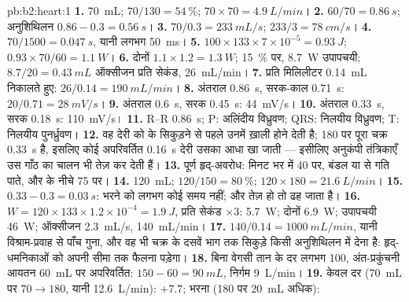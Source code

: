 \begin{solution}{pb:b2:heart:1}
\textbf{1.} \qty{70}{mL}; $70/130 = \qty{54}{\%}$; $70\times 70 =
\qty{4.9}{L/min}$।
\textbf{2.} $60/70 = \qty{0.86}{s}$; अनुशिथिलन $0.86 - 0.3 =
\qty{0.56}{s}$।
\textbf{3.} $70/0.3 = \qty{233}{mL/s}$; $233/3 = \qty{78}{cm/s}$।
\textbf{4.} $70/1500 = \qty{0.047}{s}$, यानी लगभग \qty{50}{ms}।
\textbf{5.} $100\times 133\times 7\times 10^{-5} = \qty{0.93}{J}$;
$0.93\times 70/60 = \qty{1.1}{W}$।
\textbf{6.} दोनों  $1.1\times 1.2 = \qty{1.3}{W}$;
\qty{15}{\%} पर, \qty{8.7}{W} उपापचयी; $8.7/20 = \qty{0.43}{mL}$
ऑक्सीजन प्रति सेकंड, \qty{26}{mL/min}।
\textbf{7.} प्रति मिलिलीटर  \qty{0.14}{mL} निकालते हुए:
$26/0.14 = \qty{190}{mL/min}$।
\textbf{8.} अंतराल \qty{0.86}{s}, सरक-काल \qty{0.71}{s}:
$20/0.71 = \qty{28}{mV/s}$।
\textbf{9.} अंतराल \qty{0.6}{s}, सरक \qty{0.45}{s}: \qty{44}{mV/s}।
\textbf{10.} अंतराल \qty{0.33}{s}, सरक \qty{0.18}{s}: \qty{110}{mV/s}।
\textbf{11.} R--R \qty{0.86}{s}; P: अलिंदीय विध्रुवण; QRS:
निलयीय विध्रुवण; T: निलयीय पुनर्ध्रुवण।
\textbf{12.} वह देरी  को  के सिकुड़ने से पहले
उनमें ख़ाली होने देती है; 180 पर पूरा चक्र \qty{0.33}{s} है, इसलिए कोई
अपरिवर्तित \qty{0.16}{s} देरी उसका आधा खा जाती --- इसीलिए
अनुकंपी तंत्रिकाएँ उस गाँठ का चालन भी तेज़ कर देती हैं।
\textbf{13.} पूर्ण हृद्-अवरोध:  मिनट भर में 40 पर,
बंडल या  से गति पाते, और 
 के नीचे 75 पर।
\textbf{14.} \qty{120}{mL}; $120/150 = \qty{80}{\%}$; $120\times 180 =
\qty{21.6}{L/min}$।
\textbf{15.} $0.33 - 0.3 = \qty{0.03}{s}$: भरने को लगभग कोई समय नहीं;
और तेज़ हो तो  ढह जाता है।
\textbf{16.} $W = 120\times 133\times 1.2\times 10^{-4} = \qty{1.9}{J}$,
प्रति सेकंड $\times 3$: \qty{5.7}{W}; दोनों  \qty{6.9}{W};
उपापचयी \qty{46}{W}; ऑक्सीजन \qty{2.3}{mL/s}, \qty{140}{mL/min}।
\textbf{17.} $140/0.14 = \qty{1000}{mL/min}$, यानी विश्राम-प्रवाह से
पाँच गुना, और वह भी चक्र के दसवें भाग तक सिकुड़े किसी अनुशिथिलन में देना है:
हृद्-धमनिकाओं को अपनी सीमा तक फैलना पड़ेगा।
\textbf{18.} बिना वेगसी तान के दर लगभग 100, अंत-प्रकुंचनी आयतन
\qty{60}{mL} पर अपरिवर्तित:  $150 - 60 = \qty{90}{mL}$,
निर्गम \qty{9}{L/min}।
\textbf{19.} केवल दर (\qty{70}{mL} पर $70 \to 180$, यानी
\qty{12.6}{L/min}): $+7.7$; भरना (180 पर \qty{20}{mL} अधिक):

\end{solution}
